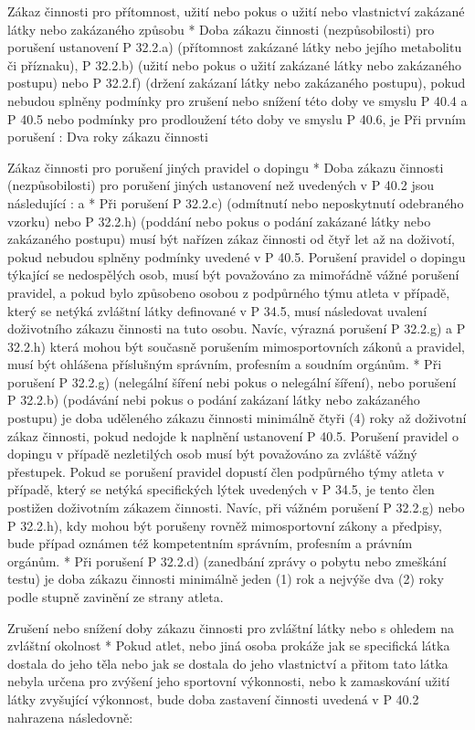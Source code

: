 Zákaz činnosti pro přítomnost, užití nebo pokus o užití nebo vlastnictví zakázané látky nebo zakázaného způsobu
* Doba zákazu činnosti (nezpůsobilosti) pro porušení ustanovení P 32.2.a) (přítomnost zakázané látky nebo jejího metabolitu či příznaku), P 32.2.b) (užití nebo pokus o užití zakázané látky nebo zakázaného postupu) nebo P 32.2.f) (držení zakázaní látky nebo zakázaného postupu), pokud nebudou splněny podmínky pro zrušení nebo snížení této doby ve smyslu P 40.4 a P 40.5 nebo podmínky pro prodloužení této doby ve smyslu P 40.6, je
  Při prvním porušení : Dva roky zákazu činnosti

Zákaz činnosti pro porušení jiných pravidel o dopingu
* Doba zákazu činnosti (nezpůsobilosti) pro porušení jiných ustanovení než uvedených v P 40.2 jsou následující :
  \begitems \style a
  * Při porušení P 32.2.c) (odmítnutí nebo neposkytnutí odebraného vzorku) nebo P 32.2.h) (poddání nebo pokus o podání zakázané látky nebo zakázaného postupu) musí být nařízen zákaz činnosti od čtyř let až na doživotí, pokud nebudou splněny podmínky uvedené v P 40.5. Porušení pravidel o dopingu týkající se nedospělých osob, musí být považováno za mimořádně vážné porušení pravidel, a pokud bylo způsobeno osobou z podpůrného týmu atleta v případě, který se netýká zvláštní látky definované v P 34.5, musí následovat uvalení doživotního zákazu činnosti na tuto osobu. Navíc, výrazná porušení P 32.2.g) a P 32.2.h) která mohou být současně porušením mimosportovních zákonů a pravidel, musí být ohlášena příslušným správním, profesním a soudním orgánům.
  * Při porušení P 32.2.g) (nelegální šíření nebi pokus o nelegální šíření), nebo porušení P 32.2.b) (podávání nebi pokus o podání zakázaní látky nebo zakázaného postupu) je doba uděleného zákazu činnosti minimálně čtyři (4) roky až doživotní zákaz činnosti, pokud nedojde k naplnění ustanovení P 40.5. Porušení pravidel o dopingu v případě nezletilých osob musí být považováno za zvláště vážný přestupek. Pokud se porušení pravidel dopustí člen podpůrného týmy atleta v případě, který se netýká specifických lýtek uvedených v P 34.5, je tento člen postižen doživotním zákazem činnosti. Navíc, při vážném porušení P 32.2.g) nebo P 32.2.h), kdy mohou být porušeny rovněž mimosportovní zákony a předpisy, bude případ oznámen též kompetentním správním, profesním a právním orgánům.
  * Při porušení P 32.2.d) (zanedbání zprávy o pobytu nebo zmeškání testu) je doba zákazu činnosti minimálně jeden (1) rok a nejvýše dva (2) roky podle stupně zavinění ze strany atleta.
  \enditems

Zrušení nebo snížení doby zákazu činnosti pro zvláštní látky nebo s ohledem na zvláštní okolnost
* Pokud atlet, nebo jiná osoba prokáže jak se specifická látka dostala do jeho těla nebo jak se dostala do jeho vlastnictví a přitom tato látka nebyla určena pro zvýšení jeho sportovní výkonnosti, nebo k zamaskování užití látky zvyšující výkonnost, bude doba zastavení činnosti uvedená v P 40.2 nahrazena následovně:

